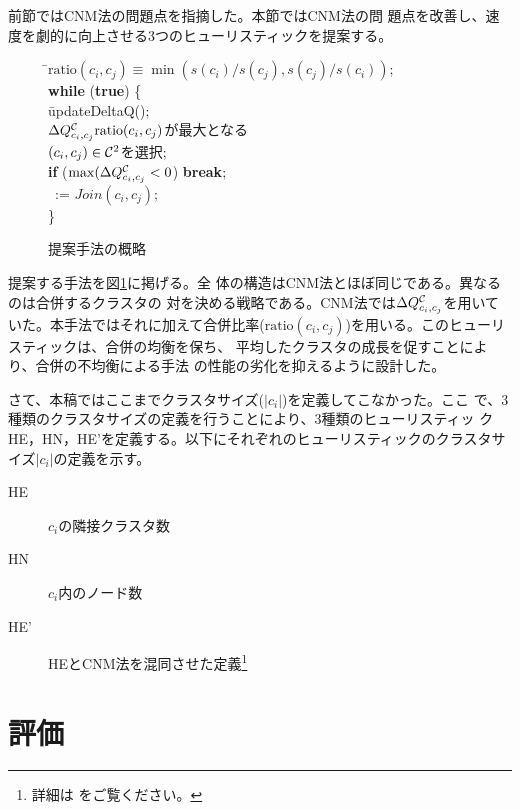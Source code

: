 \documentclass [a4j,11pt] {jsarticle}
\begin{document}
前節ではCNM法の問題点を指摘した。本節ではCNM法の問
題点を改善し、速度を劇的に向上させる3つのヒューリスティックを提案する。

\begin {figure}
\begin {tabbing}
\hspace{.3\linewidth}\=$\mathrm {ratio}(c_i,c_j) \equiv \min(s(c_i)/s(c_j), s(c_j)/s(c_i))$; \\
\>\textbf {while} (\textbf {true}) \{\\
\>\quad\= updateDeltaQ(); \\
\>\>$\Delta Q^{{\cal C}}_{c_i,c_j}\mathrm {ratio}(c_i,c_j)$が最大となる\\
\>\>\quad $(c_i, c_j) \in {\cal C}^2$を選択;\\
\>\>\textbf {if} ($\max(\Delta Q^{{\cal C}}_{c_i,c_j} < 0$) \textbf {break};\\
\>\>\clustering\ := $\mathit {Join}(c_i, c_j)$;\\
\>\}
\end {tabbing}
  \caption {提案手法の概略}
  \label {fig: tw algorithm}
\end {figure}

提案する手法を図\ref {fig: tw algorithm}に掲げる。全
体の構造はCNM法とほぼ同じである。異なるのは合併するクラスタの
対を決める戦略である。CNM法では$\Delta Q^{{\cal C}}_{c_i,c_j}$を用いていた。本手法ではそれに加えて合併比率($\mathrm
{ratio}(c_i, c_j)$)を用いる。このヒューリスティックは、合併の均衡を保ち、
平均したクラスタの成長を促すことにより、合併の不均衡による手法
の性能の劣化を抑えるように設計した。

さて、本稿ではここまでクラスタサイズ($|c_i|$)を定義してこなかった。ここ
で、3種類のクラスタサイズの定義を行うことにより、3種類のヒューリスティッ
クHE，HN，HE'を定義する。以下にそれぞれのヒューリスティックのクラスタサ
イズ$|c_i|$の定義を示す。

\begin{description}
	\item[HE]  $c_i$の隣接クラスタ数
	\item[HN]  $c_i$内のノード数
	\item[HE']  HEとCNM法を混同させた定義\footnote{詳細は \cite{wakita-2007-finding-community-structure-in-mega-scale-social}をご覧ください。}
\end{description}


\section {評価}
\label {sect: evaluation}
\end{document}
